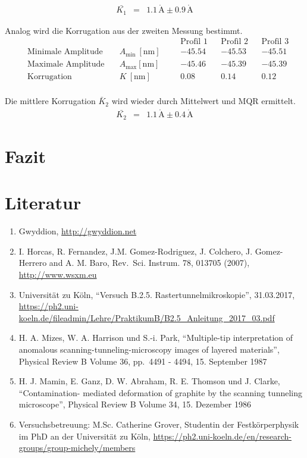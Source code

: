 \documentclass[12pt,a4paper]{scrartcl}
\numberwithin{equation}{section} %
\renewcommand{\[}{} %
\renewcommand{\]}{\noindent} %
\newcommand{\tightlist}{} %
\begin{document}
\[
\begin{eqnarray}
    \bar{K_1} &=& 1.1 \mathrm{\,\mathring{A}} \pm 0.9 \mathrm{\,\mathring{A}}
\end{eqnarray}
\]

Analog wird die Korrugation aus der zweiten Messung bestimmt. \[
\begin{align*}
    &&&&& \text{Profil 1}&& \text{Profil 2} && \text{Profil 3} \\
    &\text{Minimale Amplitude}\quad &A_\mathrm{min}\ [\mathrm{nm}] &&
        & -45.54 && -45.53 && -45.51 \\
    &\text{Maximale Amplitude}\quad &A_\mathrm{max} [\mathrm{nm}] &&
        & -45.46 && -45.39 && -45.39 \\
    &\text{Korrugation} &K\ [\mathrm{nm}] &&
        & 0.08 && 0.14 && 0.12 \\
\end{align*}
\]

Die mittlere Korrugation \(\bar K_2\) wird wieder durch Mittelwert und
MQR ermittelt. \[
\begin{eqnarray}
    \bar{K_2} &=& 1.1 \mathrm{\,\mathring{A}} \pm 0.4 \mathrm{\,\mathring{A}}
\end{eqnarray}
\]

\hypertarget{fazit}{%
\section{Fazit}\label{fazit}}

\hypertarget{literatur}{%
\section{Literatur}\label{literatur}}

\begin{enumerate}
\def\labelenumi{\arabic{enumi}.}
\tightlist
\item
  Gwyddion, \url{http://gwyddion.net}
\item
  I. Horcas, R. Fernandez, J.M. Gomez-Rodriguez, J. Colchero, J.
  Gomez-Herrero and A. M. Baro, Rev.~Sci. Instrum. 78, 013705 (2007),
  \url{http://www.wsxm.eu}
\item
  Universität zu Köln, ``Versuch B.2.5. Rastertunnelmikroskopie'',
  31.03.2017,
  \url{https://ph2.uni-koeln.de/fileadmin/Lehre/PraktikumB/B2.5_Anleitung_2017_03.pdf}
\item
  H. A. Mizes, W. A. Harrison und S.-i. Park, ``Multiple-tip
  interpretation of anomalous scanning-tunneling-microscopy images of
  layered materials'', Physical Review B Volume 36, pp.~4491 - 4494, 15.
  September 1987
\item
  H. J. Mamin, E. Ganz, D. W. Abraham, R. E. Thomson und J. Clarke,
  ``Contamination- mediated deformation of graphite by the scanning
  tunneling microscope'', Physical Review B Volume 34, 15. Dezember 1986
\item
  Versuchsbetreuung: M.Sc. Catherine Grover, Studentin der
  Festkörperphysik im PhD an der Universität zu Köln,
  \url{https://ph2.uni-koeln.de/en/research-groups/group-michely/members}
\end{enumerate}
\end{document}
